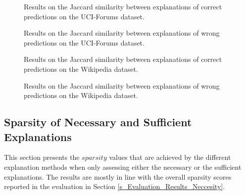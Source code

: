 \begin{figure}[ht]
    \centering
    
    \caption{Results on the Jaccard similarity between explanations of correct predictions on the UCI-Forums dataset.}
\end{figure}

\begin{figure}[ht]
    \centering
    
    \caption{Results on the Jaccard similarity between explanations of wrong predictions on the UCI-Forums dataset.}
\end{figure}

\begin{figure}[ht]
    \centering
    
    \caption{Results on the Jaccard similarity between explanations of correct predictions on the Wikipedia dataset.}
\end{figure}

\begin{figure}[ht]
    \centering
    
    \caption{Results on the Jaccard similarity between explanations of wrong predictions on the Wikipedia dataset.}
\end{figure}



\subsection{Sparsity of Necessary and Sufficient Explanations}
\label{s_Appendix_spar_nec_suf}

This section presents the $sparsity$ values that are achieved by the different explanation methods when only assessing either the necessary or the sufficient explanations. The results are mostly in line with the overall sparsity scores reported in the evaluation in Section \ref{s_Evaluation_Results_Neccesity}.

